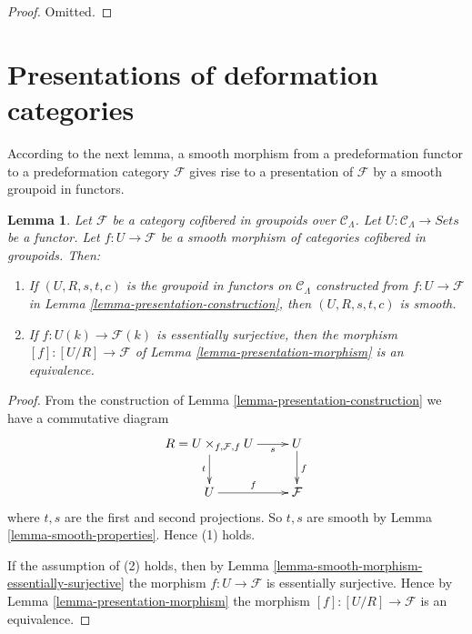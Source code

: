 \documentclass{stacks-project}
\theoremstyle{plain}
\newtheorem{lemma}[subsection]{Lemma}
\theoremstyle{definition}
\theoremstyle{remark}
\numberwithin{equation}{subsection}
\begin{document}
\begin{proof}
Omitted.
\end{proof}







\section{Presentations of deformation categories}
\label{section-presentation-deformation-categories}

\noindent
According to the next lemma, a smooth morphism from a predeformation functor to
a predeformation category $\mathcal{F}$ gives rise to a presentation of
$\mathcal{F}$ by a smooth groupoid in functors.

\begin{lemma}
\label{lemma-smooth-groupoid-in-functors-construction}
Let $\mathcal{F}$ be a category cofibered in groupoids over
$\mathcal{C}_\Lambda$. Let $U : \mathcal{C}_\Lambda \to \textit{Sets}$
be a functor. Let $f : U \to \mathcal{F}$ be a smooth morphism of
categories cofibered in groupoids. Then:
\begin{enumerate}
\item If $(U, R, s, t, c)$ is the groupoid in functors on
$\mathcal{C}_\Lambda$ constructed from $f : U \to \mathcal{F}$ in
Lemma \ref{lemma-presentation-construction}, then $(U, R, s, t, c)$
is smooth.
\item If $f : U(k) \to \mathcal{F}(k)$ is essentially surjective,
then the morphism $[f] : [U/R] \to \mathcal{F}$ of
Lemma \ref{lemma-presentation-morphism}
is an equivalence.
\end{enumerate}
\end{lemma}

\begin{proof}
From the construction of
Lemma \ref{lemma-presentation-construction}
we have a commutative diagram
$$
\xymatrix{
R = U \times_{f, \mathcal{F}, f} U \ar[r]_-s \ar[d]_t & U
\ar[d]^f \\
U \ar[r]^f & \mathcal{F}
}
$$
where $t, s$ are the first and second projections.  So $t, s$ are smooth by
Lemma \ref{lemma-smooth-properties}.  Hence (1) holds.

\medskip\noindent
If the assumption of (2) holds, then by
Lemma \ref{lemma-smooth-morphism-essentially-surjective}
the morphism $f : U \to \mathcal{F}$ is essentially surjective. Hence by
Lemma \ref{lemma-presentation-morphism}
the morphism $[f] : [U/R] \to \mathcal{F}$ is an equivalence.
\end{proof}
\end{document}
